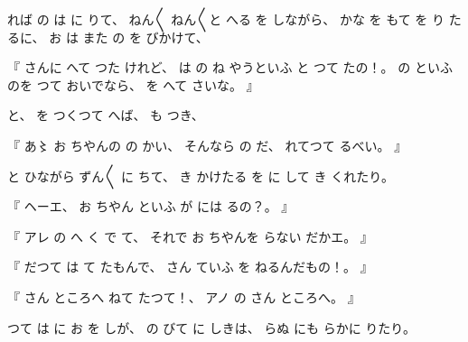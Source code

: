 %
れば
の
は
に
りて、
%
ねん〳〵
ねん〳〵と
へる
を
しながら、
%
かな
を
もて
を
り
たるに、
%
お
は
また
の
を
びかけて、

%
『
さんに
へて
つた
けれど、
%
は%
の
ね
やうといふ
と
つて
たの！。
%
の
といふのを
つて
おいでなら、
%
を
へて
さいな。
』

%
と、
%
を
つくつて
へば、
%
も
つき、

%
『
あ〻%
お
ちやんの
の
かい、
%
そんなら
の
だ、
%
れてつて
るべい。
』

%
と
ひながら
ずん〳〵
に
ちて、
%
き
かけたる
を
に
して
き
くれたり。

%
『
ヘーエ、
%
お
ちやん
といふ
が
には
るの？。
』

%
『
アレ
の
へ
く
で
て、
%
それで
お
ちやんを
らない
だかエ。
』

%
『
だつて
は
て
たもんで、
%
さん
ていふ
を
ねるんだもの！。
』

%
『
さん
ところへ
ねて
たつて！、
%
アノ
の
さん
ところへ。
』

%
つて
は
に
お
を
しが、
%
の
びて
に
しきは、
%
らぬ
にも
らかに
りたり。

